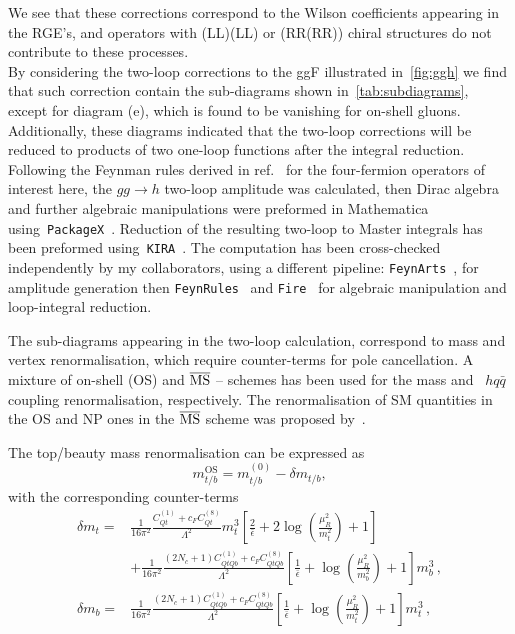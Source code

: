 \par We see that these corrections correspond to the Wilson coefficients appearing in the RGE's, and operators with (LL)(LL) or (RR(RR)) chiral structures do not contribute to these processes. \\ By considering the two-loop corrections to the ggF illustrated in~\autoref{fig:ggh} we find that such correction contain the sub-diagrams shown in~\autoref{tab:subdiagrams}, except for diagram (e), which is found to be vanishing for on-shell gluons. Additionally, these diagrams indicated that the two-loop corrections will be reduced to products of two one-loop functions after the integral reduction. \\
Following the Feynman rules derived in ref.~\cite{Dedes:2017zog} for the four-fermion operators of interest here, the $ gg \to h$ two-loop amplitude was calculated, then Dirac algebra and further algebraic manipulations were preformed in Mathematica using~\texttt{PackageX}~\cite{Patel:2015tea}. Reduction of the resulting two-loop to Master integrals has been preformed using~\texttt{KIRA}~\cite{Maierhoefer:2017hyi}. The computation has been cross-checked independently by my collaborators, using a different pipeline: \texttt{FeynArts}~\cite{Hahn:2000kx}, for amplitude generation then  \texttt{FeynRules}~\cite{Alloul:2013bka}  and  \texttt{Fire}~\cite{Smirnov:2008iw} for algebraic manipulation and loop-integral reduction. \\
\par
The sub-diagrams appearing in the two-loop calculation, correspond to mass and vertex renormalisation, which require counter-terms for pole cancellation. A mixture of on-shell (OS) and $\overline{\mathrm{MS}}$ -- schemes has been used for the mass and ~$h q \bar{q}$ coupling renormalisation, respectively. The renormalisation of SM quantities in the OS and NP ones in the $\overline{\mathrm{MS}}$ scheme was proposed by~\cite{Dawson:2018pyl}.
	\par The top/beauty mass renormalisation can be expressed as  
	\begin{equation}
		m_{t/b}^{\text{OS}}=m_{t/b}^{(0)}-\delta m_{t/b},
	\end{equation}
with the corresponding counter-terms
\begin{align}
	\delta m_t =&\frac{1}{16 \pi^2} \frac{C_{Qt}^{(1)}+c_F C_{Qt}^{(8)}}{\Lambda^2}m_t^3\left[ \frac{2}{\bar{\epsilon}} +2 \log\left(\frac{\mu_R^2}{m_t^2}\right)+1\right] \\ &+ \frac{1}{16 \pi^2}  \frac{(2 N_c+1) C_{QtQb}^{(1)}+c_F C_{QtQb}^{(8)}}{\Lambda^2}  \left[ \frac{1}{\bar{\epsilon}} +  \log\left(\frac{\mu_R^2}{m_b^2}\right)+1 \right]  m_b^3\,, \nonumber \\
	\delta m_b=&\frac{1}{16 \pi^2} \frac{(2 N_c+1)C_{QtQb}^{(1)}+c_F C_{QtQb}^{(8)}}{\Lambda^2}\left[ \frac{1}{\bar{\epsilon}} +\log\left( \frac{\mu_R^2}{m_t^2}\right)+1\right] m_t^3\,,
\end{align}
